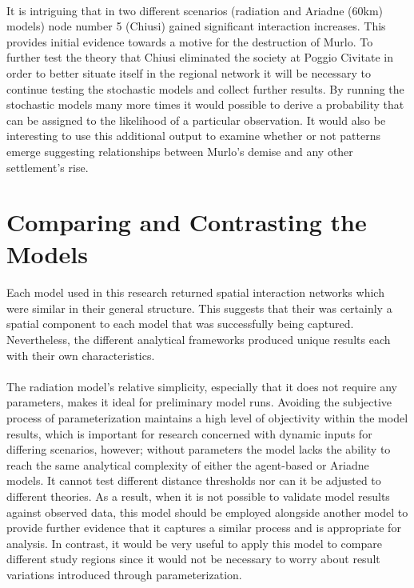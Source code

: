 \documentclass[12pt,a4paper]{thesis}
\begin{document}
\paragraph{}
It is intriguing that in two different scenarios (radiation and Ariadne (60km) models) node number 5 (Chiusi) gained significant interaction increases. This provides initial evidence towards a motive for the destruction of Murlo. To further test the theory that Chiusi eliminated the society at Poggio Civitate in order to better situate itself in the regional network it will be necessary to continue testing the stochastic models and collect further results. By running the stochastic models many more times it would possible to derive a probability that can be assigned to the likelihood of a particular observation. It would also be interesting to use this additional output to examine whether or not patterns emerge suggesting relationships between Murlo's demise and any other settlement's rise.

\section{Comparing and Contrasting the Models}
\paragraph{}
Each model used in this research returned spatial interaction networks which were similar in their general structure. This suggests that their was certainly a spatial component to each model that was successfully being captured. Nevertheless, the different analytical frameworks produced unique results each with their own characteristics.

\paragraph{}
The radiation model's relative simplicity, especially that it does not require any parameters, makes it ideal for preliminary model runs. Avoiding the subjective process of parameterization maintains a high level of objectivity within the model results, which is important for research concerned with dynamic inputs for differing scenarios, however; without parameters the model lacks the ability to reach the same analytical complexity of either the agent-based or Ariadne models. It cannot test different distance thresholds nor can it be adjusted to different theories. As a result, when it is not possible to validate model results against observed data, this model should be employed alongside another model to provide further evidence that it captures a similar process and is appropriate for analysis. In contrast, it would be very useful to apply this model to compare different study regions since it would not be necessary to worry about result variations introduced through parameterization. 
\end{document}
